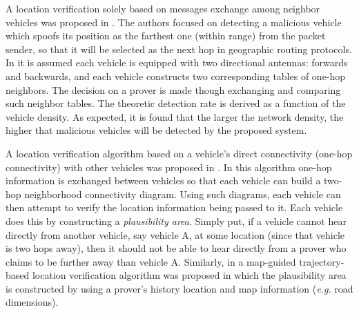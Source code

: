 \documentclass[journal]{IEEEtran}
\begin{document}
A location verification solely based on messages exchange among neighbor vehicles was proposed in \cite{ren2009location}. The authors focused on detecting a malicious vehicle which spoofs its position as the farthest one (within range) from the packet sender, so that it will be selected as the next hop in geographic routing protocols. In  \cite{ren2009location} it is assumed each vehicle is equipped with two directional antennas: forwards and backwards, and each vehicle constructs two corresponding  tables of one-hop neighbors. The decision on a prover is made though exchanging and comparing such neighbor tables. The theoretic detection rate is derived as a function of the vehicle density. As expected, it is found that the larger the network density, the higher that malicious vehicles will be detected by the proposed system.

 A location verification algorithm based on a vehicle's direct connectivity (one-hop connectivity) with other vehicles was proposed in \cite{abu2011position}. In this algorithm  one-hop information is exchanged between vehicles  so that  each vehicle can build  a two-hop neighborhood connectivity diagram. Using such diagrams, each vehicle can then attempt to verify the location information being passed to it. Each vehicle does this by constructing a \emph{plausibility area}. Simply put, if a vehicle cannot hear directly from another vehicle, say vehicle A, at some location (since that vehicle is two hops away), then it should not be able to hear directly from a prover who claims to be further away than vehicle A. Similarly, in \cite{abu2012map} a map-guided trajectory-based location verification algorithm was proposed in which the  plausibility area is constructed by using a prover's history location and map information (\emph{e.g.} road dimensions).
\end{document}
